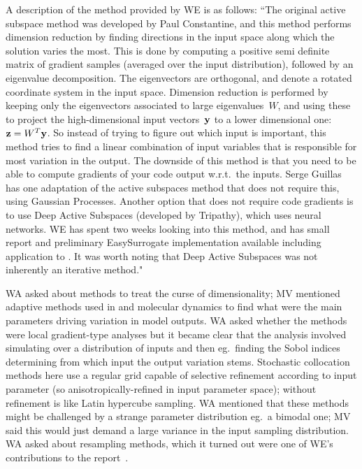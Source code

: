 A description of the method provided by WE is as follows: ``The original active 
subspace method was developed by Paul Constantine, and this method performs 
dimension reduction by finding directions in the input space along which the 
solution varies the most. This is done by computing a positive semi definite 
matrix of gradient samples (averaged over the input distribution), followed by 
an eigenvalue decomposition. The eigenvectors are orthogonal, and denote a 
rotated coordinate system in the input space. Dimension reduction is performed 
by keeping only the eigenvectors associated to large eigenvalues~$W$, and using 
these to project the high-dimensional input vectors~${\bf y}$ to a lower 
dimensional one: ${\bf z} = W^T {\bf y}$. So instead of trying to figure out 
which input is important, this method tries to find a linear combination of 
input variables that is responsible for most variation in the output. The 
downside of this method is that you need to be able to compute gradients of 
your code output w.r.t.\ the inputs. Serge Guillas has one adaptation of the active 
subspaces method that does not require this, using Gaussian Processes. Another 
option that does not require code gradients is to use Deep Active Subspaces 
(developed by Tripathy), which uses neural networks. WE has spent two weeks 
looking into this method, and has small report and preliminary EasySurrogate 
implementation available including application to . It was worth noting 
that Deep Active Subspaces was not inherently an iterative method."


WA asked about methods to treat the curse of dimensionality; MV mentioned 
adaptive methods used in  and molecular dynamics to find what were 
the main parameters driving variation in model outputs.  WA asked whether the 
methods were local gradient-type analyses but it became clear that the analysis 
involved simulating over a distribution of inputs and then eg.\ finding the 
Sobol indices determining from which input the output variation stems.  
Stochastic collocation methods here use a regular grid capable of selective 
refinement according to input parameter (so anisotropically-refined in input 
parameter space); without refinement is like Latin hypercube sampling.  WA 
mentioned that these methods might be challenged by a strange parameter distribution eg.\ a bimodal 
one; MV said this would just demand a large variance in the input sampling 
distribution.  WA asked about resampling methods, which it turned out were
one of WE's contributions to the report~\cite{2047352_1-TN-01}.


